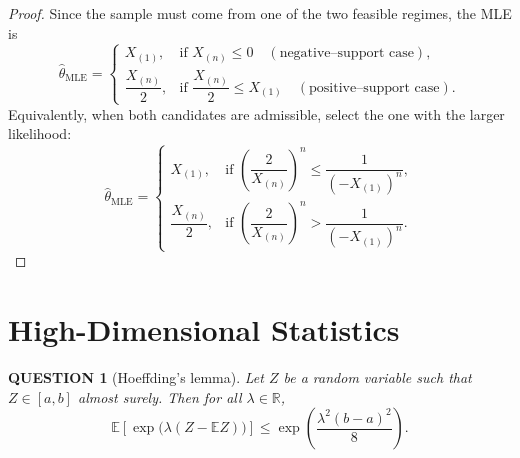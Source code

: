 \documentclass[12pt]{article}
\renewcommand{\(}{\left(}%
\renewcommand{\)}{\right)}%
\renewcommand{\[}{\left[}%
\renewcommand{\]}{\right]}%
\newtheorem{question}{QUESTION}[section]}
\newtheorem{proof}{Proof.}}
\begin{document}
\begin{proof}
Since the sample must come from one of the two feasible regimes, the MLE is
\begin{equation*}
\hat\theta_{\mathrm{MLE}}=
\begin{cases}
X_{(1)}, & \text{if } X_{(n)}\le 0 \quad(\text{negative--support case}),\\[4pt]
\dfrac{X_{(n)}}{2}, & \text{if } \dfrac{X_{(n)}}{2}\le X_{(1)} \quad(\text{positive--support case}).
\end{cases}
\end{equation*}
Equivalently, when both candidates are admissible, select the one with the larger likelihood:
\begin{equation*}
\hat\theta_{\mathrm{MLE}}=
\begin{cases}
X_{(1)}, & \text{if } \left(\dfrac{2}{X_{(n)}}\right)^{\!n}\le \dfrac{1}{(-X_{(1)})^n},\\[6pt]
\dfrac{X_{(n)}}{2}, & \text{if } \left(\dfrac{2}{X_{(n)}}\right)^{\!n}> \dfrac{1}{(-X_{(1)})^n}.
\end{cases}
\end{equation*}
\end{proof}


\section{High-Dimensional Statistics}
\begin{question}[Hoeffding's lemma]
Let $Z$ be a random variable such that $Z \in [a,b]$ almost surely. Then for all $\lambda \in \mathbb{R}$,
\begin{equation*}
\mathbb{E}\!\left[\exp\big(\lambda(Z-\mathbb{E}Z)\big)\right]
\le
\exp\!\left(\frac{\lambda^2 (b-a)^2}{8}\right).
\end{equation*}
\end{question}
\end{document}
